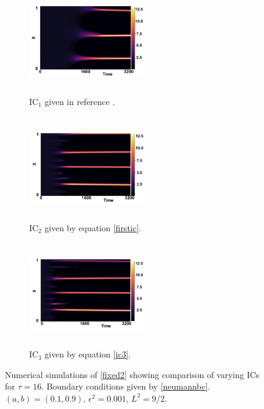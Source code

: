 \begin{figure}[H]
    \centering
    \begin{subfigure}[t]{0.32\textwidth}
        \centering
        \includegraphics[width=5cm,height=4.5cm]{ic116.png}
        \caption{$\text{IC}_1$ given in reference \cite{gaffmonk}.}
        \label{}
    \end{subfigure}
    \hfill
    \begin{subfigure}[t]{0.32\textwidth}
        \centering
        \includegraphics[width=5cm,height=4.5cm]{ic216.png}
        \caption{$\text{IC}_2$ given by equation \eqref{firstic}.}
        \label{}
    \end{subfigure}
    \hfill
    \begin{subfigure}[t]{0.32\textwidth}
        \centering
        \includegraphics[width=5cm,height=4.5cm]{ic316.png}
        \caption{$\text{IC}_3$ given by equation \eqref{ic3}.}
        \label{}
    \end{subfigure}
    \caption{Numerical simulations of \eqref{fixed2} showing comparison of varying ICs for $\tau=16$. Boundary conditions given by \eqref{neumannbc}. $(a,b)=(0.1,0.9)$, $\epsilon^2=0.001$, $L^2=9/2$.}
    \label{fig:figtau16}
\end{figure}

